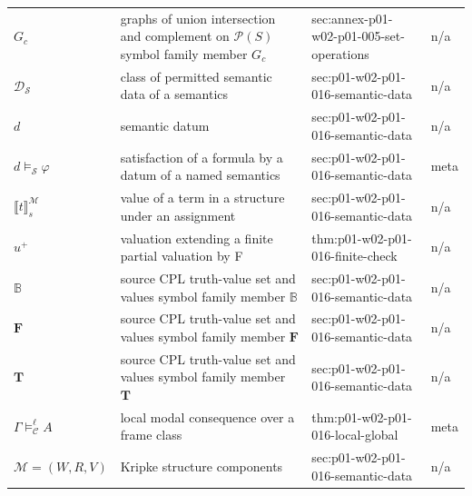 \begin{longtable}{@{}p{}p{}p{}p{}@{}}
\(G_{c}\) & graphs of union intersection and complement on \(\mathcal P(S)\) symbol family member \(G_{c}\) & sec:\allowbreak{}annex-\allowbreak{}p01-\allowbreak{}w02-\allowbreak{}p01-\allowbreak{}005-\allowbreak{}set-\allowbreak{}operations & n/a \\
\(\mathcal D_{\mathcal S}\) & class of permitted semantic data of a semantics & sec:\allowbreak{}p01-\allowbreak{}w02-\allowbreak{}p01-\allowbreak{}016-\allowbreak{}semantic-\allowbreak{}data & n/a \\
\(d\) & semantic datum & sec:\allowbreak{}p01-\allowbreak{}w02-\allowbreak{}p01-\allowbreak{}016-\allowbreak{}semantic-\allowbreak{}data & n/a \\
\(d\models_{\mathcal S}\varphi\) & satisfaction of a formula by a datum of a named semantics & sec:\allowbreak{}p01-\allowbreak{}w02-\allowbreak{}p01-\allowbreak{}016-\allowbreak{}semantic-\allowbreak{}data & meta \\
\(\llbracket t\rrbracket^{\mathcal M}_s\) & value of a term in a structure under an assignment & sec:\allowbreak{}p01-\allowbreak{}w02-\allowbreak{}p01-\allowbreak{}016-\allowbreak{}semantic-\allowbreak{}data & n/a \\
\(u^{+}\) & valuation extending a finite partial valuation by F & thm:\allowbreak{}p01-\allowbreak{}w02-\allowbreak{}p01-\allowbreak{}016-\allowbreak{}finite-\allowbreak{}check & n/a \\
\(\mathbb B\) & source CPL truth-value set and values symbol family member \(\mathbb B\) & sec:\allowbreak{}p01-\allowbreak{}w02-\allowbreak{}p01-\allowbreak{}016-\allowbreak{}semantic-\allowbreak{}data & n/a \\
\(\mathbf F\) & source CPL truth-value set and values symbol family member \(\mathbf F\) & sec:\allowbreak{}p01-\allowbreak{}w02-\allowbreak{}p01-\allowbreak{}016-\allowbreak{}semantic-\allowbreak{}data & n/a \\
\(\mathbf T\) & source CPL truth-value set and values symbol family member \(\mathbf T\) & sec:\allowbreak{}p01-\allowbreak{}w02-\allowbreak{}p01-\allowbreak{}016-\allowbreak{}semantic-\allowbreak{}data & n/a \\
\(\Gamma\models^{\ell}_{\mathcal C}A\) & local modal consequence over a frame class & thm:\allowbreak{}p01-\allowbreak{}w02-\allowbreak{}p01-\allowbreak{}016-\allowbreak{}local-\allowbreak{}global & meta \\
\(\mathcal M=(W,\allowbreak R,\allowbreak V)\) & Kripke structure components & sec:\allowbreak{}p01-\allowbreak{}w02-\allowbreak{}p01-\allowbreak{}016-\allowbreak{}semantic-\allowbreak{}data & n/a \\

\end{longtable}
